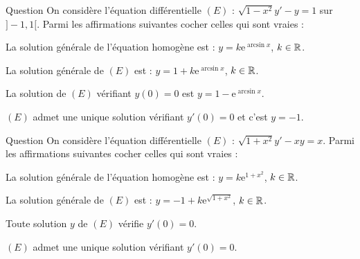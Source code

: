 \begin{multi}{Question}
On considère l'équation différentielle \((E)\) : \(\displaystyle \sqrt{1-x^2}y'-y=1\) sur \(]-1,1[\). Parmi les affirmations suivantes cocher celles qui sont vraies :

    \item* La solution générale de l'équation homogène est : \(y=k\mathrm{e}^{\arcsin x}\), \(k\in \Rr\).
    \item La solution générale de \((E)\) est : \(y=1+k\mathrm{e}^{\arcsin x}\), \(k\in \Rr\).
    \item La solution de \((E)\) vérifiant \(y(0)=0\) est \(y=1-\mathrm{e}^{\arcsin x}\).
    \item* \((E)\) admet une unique solution vérifiant \(y'(0)=0\) et c'est \(y=-1\).
\end{multi}


\begin{multi}[multiple,feedback=
{La solution générale de l'équation homogène est \(\displaystyle Y=k\mathrm{e}^{\sqrt{1+x^2}}\), \(k\in \Rr\), et \(y_0=-1\) est une solution particulière. En posant \(x=0\) dans \((E)\), on obtient \(y'(0)=0\), donc toute solution de \((E)\) vérifie \(y'(0)=0\).
}]{Question}
On considère l'équation différentielle \((E)\) : \(\displaystyle \sqrt{1+x^2}y'-xy=x\). Parmi les affirmations suivantes cocher celles qui sont vraies :

    \item La solution générale de l'équation homogène est : \(\displaystyle y=k\mathrm{e}^{1+x^2}\), \(k\in \Rr\).
    \item* La solution générale de \((E)\) est : \(\displaystyle y=-1+k\mathrm{e}^{\sqrt{1+x^2}}\), \(k\in \Rr\).
    \item* Toute solution \(y\) de \((E)\) vérifie \(y'(0)=0\).
    \item \((E)\) admet une unique solution vérifiant \(y'(0)=0\).
\end{multi}


